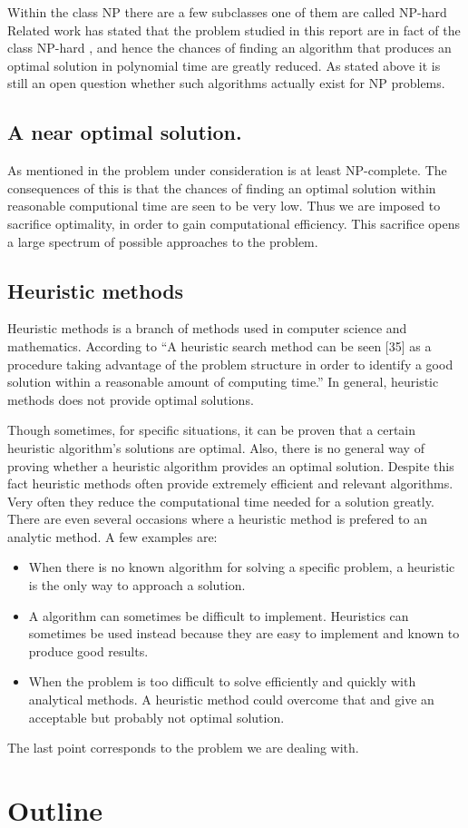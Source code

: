 Within the class NP there are a few subclasses one of them are called NP-hard 
Related work has stated that the problem studied in this report are in fact of the class NP-hard \cite{paper1}, %
and hence the chances of finding an algorithm that produces an optimal solution in polynomial time are greatly reduced. As stated above it is still an open question whether such algorithms actually exist for NP problems.
\subsection{A near optimal solution.}
As mentioned in \cite{paper1} the problem under consideration is at least NP-complete. The consequences of this is that the chances of finding an optimal solution within reasonable computional time are seen to be very low. Thus we are imposed to sacrifice optimality, in order to gain computational efficiency. This sacrifice opens a large spectrum of possible approaches to the problem.
\subsection{Heuristic methods}
Heuristic methods is a branch of methods used in computer science and mathematics. According to \cite{heuristics}``A heuristic search method can be seen [35] as a procedure taking advantage of the problem structure in order to identify a good solution within a reasonable amount of computing time.''
In general, heuristic methods does not provide optimal solutions.%



Though sometimes, for specific situations, it can be proven that a certain heuristic algorithm's solutions are optimal. Also, there is no general way of proving whether a heuristic algorithm provides an optimal solution. Despite this fact heuristic methods often provide extremely efficient and relevant algorithms. Very often they reduce the computational time needed for a solution greatly. There are even several occasions where a heuristic method is prefered to an analytic method. A few examples are:
\begin{itemize}
\item When there is no known algorithm for solving a specific problem, a heuristic is the only way to approach a solution.
\item A algorithm can sometimes be difficult to implement. Heuristics can sometimes be used instead because they are easy to implement and known to produce good results.
\item When the problem is too difficult to solve efficiently and quickly with analytical methods. A heuristic method could overcome that and give an acceptable but probably not optimal solution.
\end{itemize}

The last point corresponds to the problem we are dealing with.
\section{Outline}